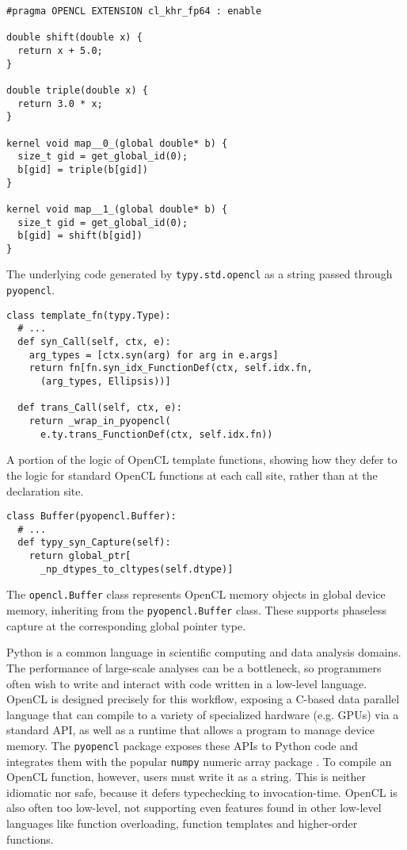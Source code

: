 \documentclass{sigplanconf}
\newcommand{\lip}[1]{\lstinline[language=Python,basicstyle=\ttfamily\small,deletendkeywords={tuple,buffer,map}]{#1}}
\begin{document}
\begin{codelisting}[t]
\begin{lstlisting}[style=OpenCL]
#pragma OPENCL EXTENSION cl_khr_fp64 : enable

double shift(double x) {
  return x + 5.0;
}

double triple(double x) {
  return 3.0 * x;
}

kernel void map__0_(global double* b) {
  size_t gid = get_global_id(0); 
  b[gid] = triple(b[gid])
}

kernel void map__1_(global double* b) {
  size_t gid = get_global_id(0);
  b[gid] = shift(b[gid])
}
\end{lstlisting}
\caption{The underlying code generated by \texttt{typy.std.opencl} as a string passed through \texttt{pyopencl}.}
\label{example-opencl-out}
\end{codelisting}
\begin{codelisting}[t]
\begin{lstlisting}
class template_fn(typy.Type):
  # ...
  def syn_Call(self, ctx, e):
    arg_types = [ctx.syn(arg) for arg in e.args]
    return fn[fn.syn_idx_FunctionDef(ctx, self.idx.fn, 
      (arg_types, Ellipsis))]

  def trans_Call(self, ctx, e):
    return _wrap_in_pyopencl(
      e.ty.trans_FunctionDef(ctx, self.idx.fn))
\end{lstlisting}
\caption{A portion of the logic of OpenCL template functions, showing how they defer to the logic for standard OpenCL functions at each call site, rather than at the declaration site.}
\label{example-opencl-templatefn}
\end{codelisting}
\begin{codelisting}[t]
\begin{lstlisting}
class Buffer(pyopencl.Buffer):
  # ...
  def typy_syn_Capture(self):
    return global_ptr[
      _np_dtypes_to_cltypes(self.dtype)]
\end{lstlisting}
\caption{The \texttt{opencl.Buffer} class represents OpenCL memory objects in global device memory, inheriting from the \texttt{pyopencl.Buffer} class. These supports phaseless capture at the corresponding global pointer type.}
\label{example-opencl-buffer}
\end{codelisting}

Python is a common language in scientific computing and data analysis domains. The performance of large-scale analyses can be a bottleneck, so programmers often wish to write and interact with code written in a low-level language. OpenCL is designed precisely for this workflow, exposing a C-based data parallel language that can compile to a variety of specialized hardware (e.g. GPUs) via a standard API, as well as a runtime that allows a program to manage device memory. The \lip{pyopencl} package exposes these APIs to Python code and integrates them with the popular \lip{numpy} numeric array package \cite{klockner2011pycuda}. To compile an OpenCL function, however, users must write it as a string. This is neither idiomatic nor safe, because it defers typechecking to invocation-time. OpenCL is also often too low-level, not supporting even features found in other low-level languages like function overloading, function templates and higher-order functions.
\end{document}
